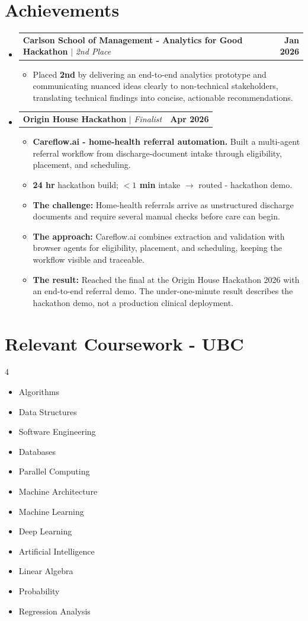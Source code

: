 \documentclass[letterpaper,11pt]{article}
\makeatletter
\newcommand{\resumeItem}[1]{
  \item\small{
    {#1 \vspace{-2pt}}
  }
}
\newcommand{\resumeProjectHeading}[2]{
    \item
    \begin{tabular*}{1.001\textwidth}{l@{\extracolsep{\fill}}r}
      \small#1 & \textbf{\small #2}\\
    \end{tabular*}\vspace{-7pt}
}
\newcommand{\resumeSubHeadingListStart}{\begin{itemize}[leftmargin=0.0in, label={}]}
\newcommand{\resumeSubHeadingListEnd}{\end{itemize}}
\newcommand{\resumeItemListStart}{\begin{itemize}}
\newcommand{\resumeItemListEnd}{\end{itemize}\vspace{-5pt}}
\makeatother
\begin{document}
\section{Achievements}
\vspace{-5pt}
\resumeSubHeadingListStart
  \resumeProjectHeading
    {{\textbf{Carlson School of Management - Analytics for Good Hackathon}} $|$ \emph{2nd Place}}{Jan 2026}
    \resumeItemListStart
      \resumeItem{Placed \textbf{2nd} by delivering an end-to-end analytics prototype and communicating nuanced ideas clearly to non-technical stakeholders, translating technical findings into concise, actionable recommendations.}
    \resumeItemListEnd
  \resumeProjectHeading
    {{\textbf{Origin House Hackathon}} $|$ \emph{Finalist}}{Apr 2026}
    \resumeItemListStart
      \resumeItem{\textbf{Careflow.ai - home-health referral automation.} Built a multi-agent referral workflow from discharge-document intake through eligibility, placement, and scheduling.}
      \resumeItem{\textbf{24 hr} hackathon build; \textbf{$<1$ min} intake $\rightarrow$ routed - hackathon demo.}
      \resumeItem{\textbf{The challenge:} Home-health referrals arrive as unstructured discharge documents and require several manual checks before care can begin.}
      \resumeItem{\textbf{The approach:} Careflow.ai combines extraction and validation with browser agents for eligibility, placement, and scheduling, keeping the workflow visible and traceable.}
      \resumeItem{\textbf{The result:} Reached the final at the Origin House Hackathon 2026 with an end-to-end referral demo. The under-one-minute result describes the hackathon demo, not a production clinical deployment.}
    \resumeItemListEnd
\resumeSubHeadingListEnd
\vspace{-15pt}

\section{Relevant Coursework - UBC}
{\small
\begin{multicols}{4}
\begin{itemize}[itemsep=-5pt, topsep=3pt, parsep=3pt, partopsep=3pt]
  \item Algorithms
  \item Data Structures
  \item Software Engineering
  \item Databases
  \item Parallel Computing
  \item Machine Architecture
  \item Machine Learning
  \item Deep Learning
  \item Artificial Intelligence
  \item Linear Algebra
  \item Probability
  \item Regression Analysis
\end{itemize}
\end{multicols}
\vspace*{-\multicolsep}
}
\end{document}
